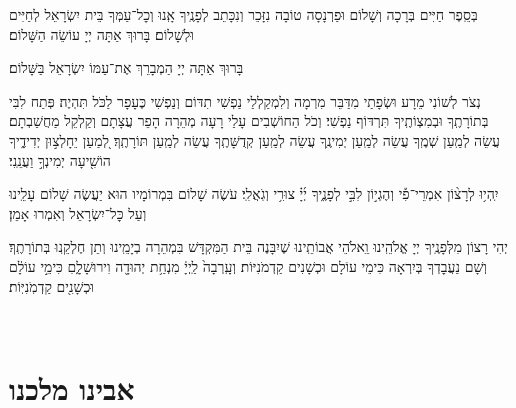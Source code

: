{
\begin{paracol}{2}
\begin{small}
בְּסֵֽפֶר חַיִּים בְּרָכָה וְשָׁלוֹם וּפַרְנָסָה טוֹבָה נִזָּכֵר וְנִכָּתֵב לְפָנֶֽיךָ אָֽנוּ וְכׇל־עַמְּךָ בֵּית יִשְׂרָאֵל לְחַיִּים וּלְשָׁלוֹם׃ בָּרוּךְ אַתָּה יְיָ עוֹשֵׂה הַשָּׁלוֹם׃

\end{small}
\switchcolumn
בָּרוּךְ אַתָּה יְיָ הַמְבָרֵךְ אֶת־עַמּוֹ יִשְׂרָאֵל בַּשָּׁלוֹם׃

\end{paracol}

נְצֹר לְשׁוֹנִי מֵרָע וּשְׂפָתַי מִדַּבֵּר מִרְמָה וְלִמְקַלְלַי נַפְשִׁי תִדּוֹם וְנַפְשִׁי כֶּעָפָר לַכֹּל תִּהְיֶה׃ פְּתַח לִבִּי בְּתוֹרָתֶֽךָ וּבְמִצְוֹתֶֽיךָ תִּרְדּוֹף נַפְשִׁי׃ וְכֹל הַחוֹשְׁבִים עָלַי רָעָה מְהֵרָה הָפֵר עֲצָתָם וְקַלְקֵל מַחֲשַׁבְתָם׃ עֲשֵׂה לְמַֽעַן שְׁמֶֽךָ עֲשֵׂה לְמַֽעַן יְמִינֶֽךָ עֲשֵׂה לְמַֽעַן קְדֻשָּׁתֶֽךָ עֲשֵׂה לְמַֽעַן תּוֹרָתֶֽךָ׃ לְ֭מַעַן יֵחָלְצ֣וּן יְדִידֶ֑יךָ
הוֹשִׁ֖יעָה יְמִינְךָ֣ וַעֲנֵֽנִי׃

\personalfast

יִֽהְי֥וּ לְרָצ֨וֹן אִמְרֵי־פִ֡י וְהֶגְי֣וֹן לִבִּ֣י לְפָנֶ֑יךָ יְ֜יָ֗ צוּרִ֥י וְגֹֽאֲלִֽי׃ עֹשֶׂה שָׁלוֹם בִּמְרוֹמָיו הוּא יַעֲשֶׂה שָׁלוֹם עָלֵֽינוּ וְעַל כׇּל־יִשְׂרָאֵל וְאִמְרוּ אָמֵן׃


\begin{small}

יְהִי רָצוֹן מִלְּפָנֶֽיךָ יְיָ אֱלֹהֵֽינוּ וִֵאלֹהֵי אֲבוֹתֵֽינוּ שֶׁיִבָּנֶה בֵּית הַמִּקְדָּשׁ בִּמְהֵרָה בְיָמֵֽינוּ וְתֵן חֶלְקֵֽנוּ בְּתוֹרָתֶֽךָ׃ וְשָׁם נַעֲבׇדְךָ בְּיִרְאָה כִּימֵי עוֹלָם וּכְשָׁנִים קַדְמֹנִיּוֹת׃
וְעָֽרְבָה֙ לַֽיְיָ֔ מִנְחַ֥ת יְהוּדָ֖ה וִירוּשָׁלָ֑םִ כִּימֵ֣י עוֹלָ֔ם וּכְשָׁנִ֖ים קַדְמֹֽנִיּֽוֹת׃


\end{small}



\\

\section[אבינו מלכנו]{ אבינו מלכנו }


\avinumalkeinu

\\

}
